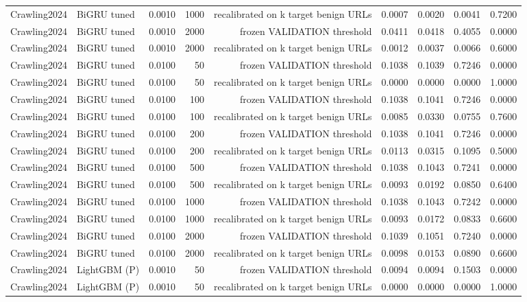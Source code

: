 \begin{table}[t]
\begin{tabular}{llrrrrrrr}
Crawling2024 & BiGRU tuned & 0.0010 & 1000 & recalibrated on k target benign URLs & 0.0007 & 0.0020 & 0.0041 & 0.7200 \\
Crawling2024 & BiGRU tuned & 0.0010 & 2000 & frozen VALIDATION threshold & 0.0411 & 0.0418 & 0.4055 & 0.0000 \\
Crawling2024 & BiGRU tuned & 0.0010 & 2000 & recalibrated on k target benign URLs & 0.0012 & 0.0037 & 0.0066 & 0.6000 \\
Crawling2024 & BiGRU tuned & 0.0100 & 50 & frozen VALIDATION threshold & 0.1038 & 0.1039 & 0.7246 & 0.0000 \\
Crawling2024 & BiGRU tuned & 0.0100 & 50 & recalibrated on k target benign URLs & 0.0000 & 0.0000 & 0.0000 & 1.0000 \\
Crawling2024 & BiGRU tuned & 0.0100 & 100 & frozen VALIDATION threshold & 0.1038 & 0.1041 & 0.7246 & 0.0000 \\
Crawling2024 & BiGRU tuned & 0.0100 & 100 & recalibrated on k target benign URLs & 0.0085 & 0.0330 & 0.0755 & 0.7600 \\
Crawling2024 & BiGRU tuned & 0.0100 & 200 & frozen VALIDATION threshold & 0.1038 & 0.1041 & 0.7246 & 0.0000 \\
Crawling2024 & BiGRU tuned & 0.0100 & 200 & recalibrated on k target benign URLs & 0.0113 & 0.0315 & 0.1095 & 0.5000 \\
Crawling2024 & BiGRU tuned & 0.0100 & 500 & frozen VALIDATION threshold & 0.1038 & 0.1043 & 0.7241 & 0.0000 \\
Crawling2024 & BiGRU tuned & 0.0100 & 500 & recalibrated on k target benign URLs & 0.0093 & 0.0192 & 0.0850 & 0.6400 \\
Crawling2024 & BiGRU tuned & 0.0100 & 1000 & frozen VALIDATION threshold & 0.1038 & 0.1043 & 0.7242 & 0.0000 \\
Crawling2024 & BiGRU tuned & 0.0100 & 1000 & recalibrated on k target benign URLs & 0.0093 & 0.0172 & 0.0833 & 0.6600 \\
Crawling2024 & BiGRU tuned & 0.0100 & 2000 & frozen VALIDATION threshold & 0.1039 & 0.1051 & 0.7240 & 0.0000 \\
Crawling2024 & BiGRU tuned & 0.0100 & 2000 & recalibrated on k target benign URLs & 0.0098 & 0.0153 & 0.0890 & 0.6600 \\
Crawling2024 & LightGBM (P) & 0.0010 & 50 & frozen VALIDATION threshold & 0.0094 & 0.0094 & 0.1503 & 0.0000 \\
Crawling2024 & LightGBM (P) & 0.0010 & 50 & recalibrated on k target benign URLs & 0.0000 & 0.0000 & 0.0000 & 1.0000 \\

\end{tabular}
\end{table}

